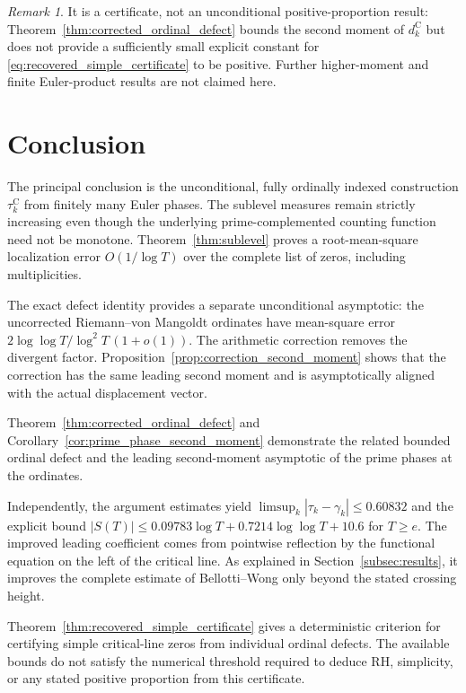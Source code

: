 \documentclass[11pt,a4paper]{article}
\makeatletter
\numberwithin{equation}{section}
\DeclareRobustCommand{\CGref}[1]{\ref{#1}}
\DeclareRobustCommand{\CGeqref}[1]{\eqref{#1}}
\let\CG@origref\ref
\let\CG@origeqref\eqref
\newcommand{\CG@gettip}[1]{\@ifundefined{CGTip@#1}{#1}{\csname CGTip@#1\endcsname}}
\DeclareRobustCommand{\CGref}[1]{\pdftooltip{\CG@origref{#1}}{\CG@gettip{#1}}}
\DeclareRobustCommand{\CGeqref}[1]{\pdftooltip{\CG@origeqref{#1}}{\CG@gettip{#1}}}
\theoremstyle{definition}
\theoremstyle{remark}
\newtheorem{remark}[theorem]{Remark}
\makeatother
\begin{document}
\begin{remark}\label{rem:certificate_scope}
It is a certificate, not an unconditional positive-proportion result:
Theorem~\CGref{thm:corrected_ordinal_defect} bounds the second moment
of $d_k^{\mathrm C}$ but does not provide a sufficiently small explicit
constant for \CGeqref{eq:recovered_simple_certificate} to be positive.
Further higher-moment and finite Euler-product results are not claimed here.
\end{remark}

\section{Conclusion}\label{sec:conclusion}
The principal conclusion is the unconditional, fully ordinally indexed
construction $\tau_k^{\mathrm C}$ from finitely many Euler phases.
The sublevel measures remain strictly increasing even though the
underlying prime-complemented counting function need not be monotone.
Theorem~\CGref{thm:sublevel} proves a root-mean-square localization error
$O(1/\log T)$ over the complete list of zeros, including multiplicities.

The exact defect identity provides a separate unconditional asymptotic:
the uncorrected Riemann--von Mangoldt ordinates have mean-square error
$2\log\log T/\log^2T\,(1+o(1))$. The arithmetic correction removes the
divergent factor. Proposition~\CGref{prop:correction_second_moment} shows that
the correction has the same leading second moment and is asymptotically aligned with
the actual displacement vector.

Theorem~\CGref{thm:corrected_ordinal_defect}
and Corollary~\CGref{cor:prime_phase_second_moment} demonstrate the related
bounded ordinal defect and the leading second-moment asymptotic of the prime phases
at the ordinates.

Independently, the argument estimates yield
$\limsup_k|\tau_k-\gamma_k|\le0.60832$ and the explicit bound
$|S(T)|\le0.09783\log T+0.7214\log\log T+10.6$ for $T\ge e$.
The improved leading coefficient comes from pointwise reflection by the
functional equation on the left of the critical line. As explained in
Section~\CGref{subsec:results}, it improves the complete estimate of
Bellotti--Wong only beyond the stated crossing height.

Theorem~\CGref{thm:recovered_simple_certificate} gives a deterministic criterion for certifying simple
critical-line zeros from individual ordinal defects. The available bounds
do not satisfy the numerical threshold required to deduce RH, simplicity,
or any stated positive proportion from this certificate.
\end{document}
